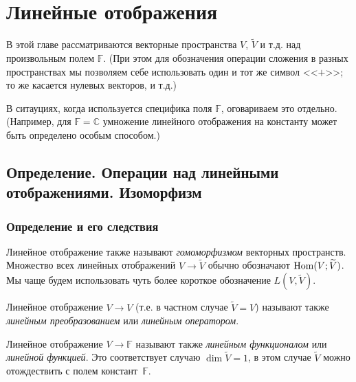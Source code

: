 \chapter{Линейные отображения}\label{lin_otobr}


В этой главе рассматриваются векторные пространства 
 $V$, $\widetilde{V}$ и т.д. над произвольным полем $\mathbb{F}$.
(При этом для обозначения операции сложения  в разных пространствах 
мы позволяем себе использовать один и тот же символ <<$+$>>; то же касается нулевых векторов, и т.д.)

В ситауциях, когда используется специфика поля $\mathbb{F}$, оговариваем это отдельно. 
(Например, для $\mathbb{F} = \mathbb{C}$ умножение линейного отображения на константу может быть определено
особым способом.)


\section{Определение. Операции над линейными отображениями. Изоморфизм}

\subsection{Определение и его следствия}




Линейное отображение также называют {\it гомоморфизмом} векторных пространств.
Множество всех линейных отображений $V \to \widetilde{V}$ обычно
обозначают $\mathop{\rm Hom}\nolimits(V; \widetilde{V})$.
Мы чаще будем использовать чуть более короткое обозначение $L(V, \widetilde{V})$.

Линейное отображение $V \to V$ (т.е. в частном случае $\widetilde{V}=V$)
называют также  {\it линейным преобразованием} или {\it линейным оператором}.

Линейное отображение $V \to \mathbb{F}$
называют также  {\it линейным функционалом} или {\it линейной функцией}.
Это соответствует случаю $\dim \widetilde{V} = 1$, в этом случае 
$\widetilde{V}$ можно отождествить с полем констант~$\mathbb{F}$.





